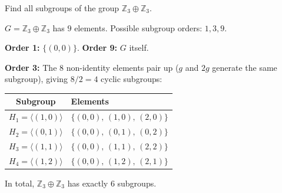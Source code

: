 \documentclass[12pt,a4paper]{article}
\newenvironment{problem}{\begin{mdframed}[style=problemstyle]}{\end{mdframed}}
\newenvironment{sol}{\begin{mdframed}[style=solstyle]}{\end{mdframed}}
\newcommand{\Z}{\mathbb{Z}}
\newcommand{\gen}[1]{\langle #1 \rangle}
\begin{document}
\begin{problem}
Find all subgroups of the group $\Z_3 \oplus \Z_3$.
\end{problem}

\begin{sol}
$G = \Z_3 \oplus \Z_3$ has $9$ elements. Possible subgroup orders: $1, 3, 9$.

\medskip
\textbf{\color{SectCol}Order 1:} $\{(0,0)\}$.
\qquad\textbf{\color{SectCol}Order 9:} $G$ itself.

\medskip
\textbf{\color{SectCol}Order 3:}
The $8$ non-identity elements pair up ($g$ and $2g$ generate the same subgroup),
giving $8/2 = 4$ cyclic subgroups:

\smallskip
\begin{center}
\renewcommand{\arraystretch}{1.15}
\begin{tabular}{cl}
  \toprule
  Subgroup & Elements \\
  \midrule
  $H_1 = \gen{(1,0)}$ & $\{(0,0),\,(1,0),\,(2,0)\}$ \\
  $H_2 = \gen{(0,1)}$ & $\{(0,0),\,(0,1),\,(0,2)\}$ \\
  $H_3 = \gen{(1,1)}$ & $\{(0,0),\,(1,1),\,(2,2)\}$ \\
  $H_4 = \gen{(1,2)}$ & $\{(0,0),\,(1,2),\,(2,1)\}$ \\
  \bottomrule
\end{tabular}
\end{center}

\medskip
In total, $\Z_3 \oplus \Z_3$ has exactly $\boxed{6}$ subgroups.
\end{sol}
\end{document}
